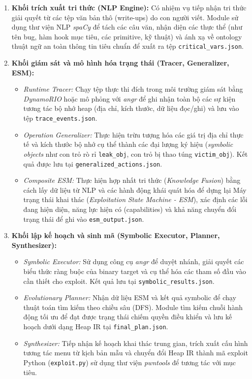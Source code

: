 \documentclass[final]{hcmuitthesis}
\begin{document}
\begin{enumerate}
    \item \textbf{Khối trích xuất tri thức (NLP Engine):} Có nhiệm vụ tiếp nhận tri thức giải quyết từ các tệp văn bản thô (write-ups) do con người viết. Module sử dụng thư viện NLP \textit{spaCy} để tách các câu văn, nhận diện các thực thể (như tên bug, hàm hook mục tiêu, các primitive, kỹ thuật) và ánh xạ về ontology thuật ngữ an toàn thông tin tiêu chuẩn để xuất ra tệp \texttt{critical\_vars.json}.
    \item \textbf{Khối giám sát và mô hình hóa trạng thái (Tracer, Generalizer, ESM):}
    \begin{itemize}
        \item \textit{Runtime Tracer:} Chạy tệp thực thi đích trong môi trường giám sát bằng \textit{DynamoRIO} hoặc mô phỏng với \textit{angr} để ghi nhận toàn bộ các sự kiện tương tác bộ nhớ heap (địa chỉ, kích thước, dữ liệu đọc/ghi) và lưu vào tệp \texttt{trace\_events.json}.
        \item \textit{Operation Generalizer:} Thực hiện trừu tượng hóa các giá trị địa chỉ thực tế và kích thước bộ nhớ cụ thể thành các đại lượng ký hiệu (\textit{symbolic objects} như con trỏ rò rỉ \texttt{leak\_obj}, con trỏ bị thao túng \texttt{victim\_obj}). Kết quả được lưu tại \texttt{generalized\_actions.json}.
        \item \textit{Composite ESM:} Thực hiện hợp nhất tri thức (\textit{Knowledge Fusion}) bằng cách lấy dữ liệu từ NLP và các hành động khái quát hóa để dựng lại Máy trạng thái khai thác (\textit{Exploitation State Machine - ESM}), xác định các lỗi đang hiện diện, năng lực hiện có (capabilities) và khả năng chuyển đổi trạng thái để ghi vào \texttt{esm\_output.json}.
    \end{itemize}
    \item \textbf{Khối lập kế hoạch và sinh mã (Symbolic Executor, Planner, Synthesizer):}
    \begin{itemize}
        \item \textit{Symbolic Executor:} Sử dụng công cụ \textit{angr} để duyệt nhánh, giải quyết các biểu thức ràng buộc của binary target và cụ thể hóa các tham số đầu vào cần thiết cho exploit. Kết quả lưu tại \texttt{symbolic\_results.json}.
        \item \textit{Evolutionary Planner:} Nhận dữ liệu ESM và kết quả symbolic để chạy thuật toán tìm kiếm theo chiều sâu (DFS). Module tìm kiếm chuỗi hành động tối ưu để đạt được trạng thái chiếm quyền điều khiển và lưu kế hoạch dưới dạng Heap IR tại \texttt{final\_plan.json}.
        \item \textit{Synthesizer:} Tiếp nhận kế hoạch khai thác trung gian, trích xuất cấu hình tương tác menu từ kịch bản mẫu và chuyển đổi Heap IR thành mã exploit Python (\texttt{exploit.py}) sử dụng thư viện \textit{pwntools} để tương tác với mục tiêu.
    \end{itemize}
\end{enumerate}
\end{document}

